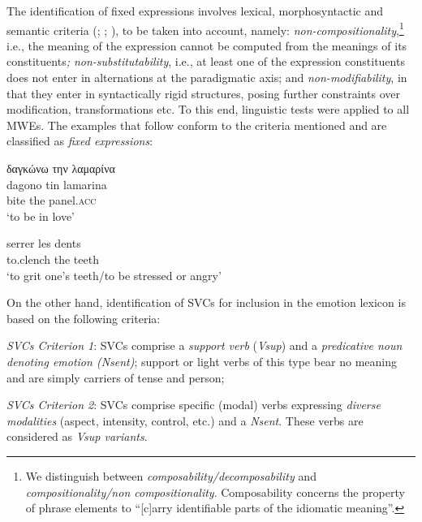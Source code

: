 \documentclass[output=paper]{langsci/langscibook}
\begin{document}
The identification of fixed expressions
involves lexical, morphosyntactic and semantic criteria (\citealt{gross1982}; \citealt{Gross1988a}; \citealt{lamiroy2003}), to be taken into account, namely:
\textit{non-compositionality},\footnote{We distinguish between
\textit{composability/decomposability} \citep[496]{Nunberg1994} and 
\textit{compositionality/non compositionality}. Composability concerns
the property of phrase elements to ``[c]arry
identifiable parts of the idiomatic meaning”.} i.e., the meaning of the expression cannot
be computed from the meanings of its constituents\textit{;
non-substitutability}, i.e., at least one of the expression
constituents does not enter in alternations at the paradigmatic axis;
and \textit{non-modifiability}, in that they enter in
syntactically rigid structures, posing further constraints over
modification, transformations etc. To this end, linguistic tests were
applied to all MWEs. The examples that follow conform to the criteria
mentioned and are classified as \textit{fixed expressions}:

\begin{exe}
\ex \label{ex:3:6}
\glll δαγκώνω την λαμαρίνα \\
dagono tin lamarina\\
bite the panel.\textsc{acc}\\
\glt %
‘to be in love’
\end{exe}

\begin{exe}
\ex \label{ex:3:7}
\gll serrer les dents \\
to.clench the teeth\\
\glt ‘to grit one's teeth/to be stressed or angry’
\end{exe}

On the other hand, identification of SVCs for inclusion in the emotion
lexicon is based on the following criteria:

\textit{SVCs Criterion 1}: SVCs comprise a \textit{support verb} (\textit{Vsup}) and a \textit{predicative
noun denoting emotion (Nsent)}; support or light verbs of this type
bear no meaning and are simply carriers of tense and person;

\textit{SVCs Criterion 2}: SVCs comprise specific (modal) verbs expressing
\textit{diverse modalities} (aspect, intensity, control,
etc.) and a \textit{Nsent}. These verbs are considered as \textit{Vsup
variants}.
\end{document}
